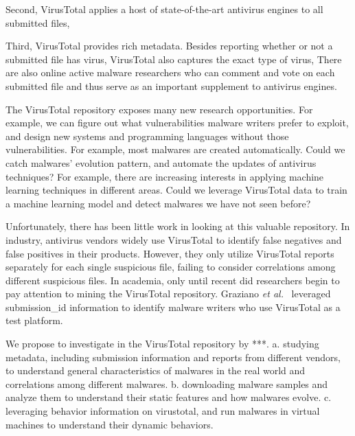 Second, VirusTotal applies a host of state-of-the-art antivirus engines to all submitted files,


Third, VirusTotal provides rich metadata. 
Besides reporting whether or not a submitted file has virus, 
VirusTotal also captures the exact type of virus, 
There are also online active malware researchers 
who can comment and vote on each submitted file 
and thus serve as an important supplement to antivirus engines. 

The VirusTotal repository exposes many new research opportunities.
For example, we can figure out what vulnerabilities malware writers prefer to exploit, 
and design new systems and programming languages without those vulnerabilities. 
For example, most malwares are created automatically. 
Could we catch malwares' evolution pattern, and automate the updates of antivirus techniques?
For example, there are increasing interests in applying machine learning techniques in different areas. 
Could we leverage VirusTotal data to train a machine learning model and detect malwares we have not seen before? 

Unfortunately, there has been little work in looking at this valuable repository.
In industry, antivirus vendors widely use VirusTotal to identify false negatives 
and false positives in their products. 
However, they only utilize VirusTotal reports separately for each single suspicious file, 
failing to consider correlations among different suspicious files. 
In academia, only until recent did researchers begin to pay attention to mining the VirusTotal repository. 
Graziano \textit{et al.}~\citet{neeles} leveraged submission\_id information to identify malware writers 
who use VirusTotal as a test platform. 

We propose to investigate in the VirusTotal repository by ***.
a. studying metadata, including submission information and reports from different vendors, 
to understand general characteristics of malwares in the real world and correlations among different malwares. 
b. downloading malware samples and analyze them to understand their static features and how malwares evolve. 
c. leveraging behavior information on virustotal, and run malwares in virtual machines to understand their dynamic behaviors. 

